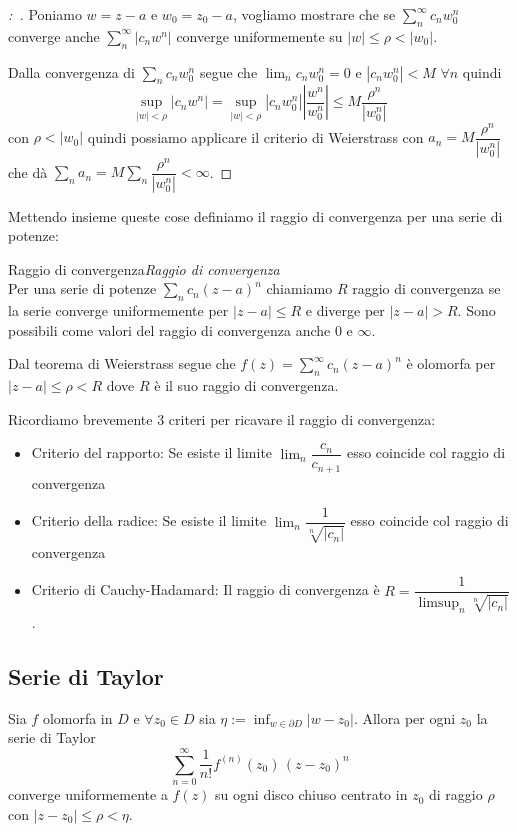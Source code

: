 \documentclass[11pt,a4paper,twoside]{book}
\newenvironment{definizione}[1][\empty]{\begin{Definizione}{
\ifx\empty#1\relax\else\mdseries\itshape#1\\\fi
}{}}{\end{Definizione}}
\newenvironment{dimo}[1][\proofname]{
	\begin{tcolorbox}[
	breakable, 
	enhanced, 
	interior hidden, 
	frame hidden, 
	borderline west = {1pt}{0pt}{gray}, 
	top=0pt, bottom=0pt, left=0pt]
\begin{proof}[#1:~]
}
{
\end{proof}
\end{tcolorbox}
}
\theoremstyle{esss}
\theoremstyle{dotless}
\numberwithin{equation}{section} %
\begin{document}
\begin{dimo}
Poniamo $w=z-a$ e  $w_0=z_0-a$, vogliamo mostrare che se $\sum_n^\infty c_nw_0^n$ converge anche $\sum_n^\infty |c_n w^n|$ converge uniformemente su $|w|\leq\rho<|w_0|$.


Dalla convergenza di $\sum_n c_n w_0^n$ segue che $\lim_n c_nw_0^n=0$ e $|c_nw_0^n|<M$ $\forall n$ quindi \[\sup_{|w|<\rho}|c_n w^n|=\sup_{|w|<\rho} |c_n w_0^n| |\dfrac{w^n}{w_0^n}| \leq M \dfrac{\rho^n}{|w_0^n|}\] con $\rho<|w_0|$ quindi possiamo applicare il criterio di Weierstrass con $a_n=M \dfrac{\rho^n}{|w_0^n|}$ che dà $\sum_n a_n= M \sum_n \dfrac{\rho^n}{|w_0^n|}< \infty$. \qedhere
\end{dimo}

Mettendo insieme queste cose definiamo il raggio di convergenza per una serie di potenze:

\begin{definizione}[Raggio di convergenza]
Per una serie di potenze  $\sum_n c_n (z-a)^n$ chiamiamo $R$ raggio di convergenza se la serie converge uniformemente per $|z-a|\leq R$ e diverge per $|z-a|>R$. 
Sono possibili come valori del raggio di convergenza anche $0$ e $\infty$.
\end{definizione}

Dal teorema di Weierstrass segue che $f(z)=\sum_n^\infty c_n (z-a)^n$ è olomorfa per $|z-a|\leq \rho < R$ dove $R$ è il suo raggio di convergenza.

Ricordiamo brevemente $3$ criteri per ricavare il raggio di convergenza:\begin{itemize}[label=$\cdot$]
\item Criterio del rapporto: Se esiste il limite $\lim_{n}\dfrac{c_n}{c_{n+1}}$ esso coincide col raggio di convergenza
\item Criterio della radice: Se esiste il limite $\lim_{n}\dfrac{1}{\sqrt[n]{|c_n|}}$ esso coincide col raggio di convergenza
\item Criterio di Cauchy-Hadamard: Il raggio di convergenza è $R=\dfrac{1}{\limsup_n \sqrt[n]{|c_n|}}$. 
\end{itemize}

\subsection*{Serie di Taylor}

Sia $f$ olomorfa in $D$ e $\forall z_0\in D$ sia $\eta:=\inf_{w\in \partial D}|w-z_0|$. Allora per ogni $z_0$ la serie di Taylor 
\begin{equation}
\sum_{n=0}^\infty \dfrac{1}{n!} f^{(n)}(z_0)\,(z-z_0)^n
\end{equation}
converge uniformemente a $f(z)$ su ogni disco chiuso centrato in $z_0$ di raggio $\rho$ con $|z-z_0|\leq \rho<\eta$.
\end{document}
